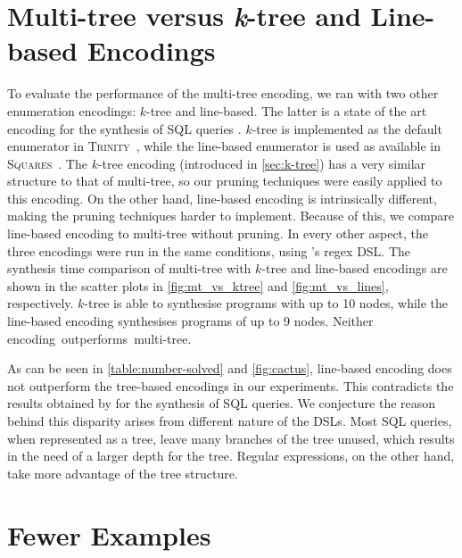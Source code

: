 \section{Multi-tree versus \texorpdfstring{\textit{k}-tree}{k-tree} and Line-based Encodings}\label{sec:multi-tree-vs-encodings}



To evaluate the performance of the multi-tree encoding, we ran \Forest{} with two other enumeration encodings: \(k\)-tree and line-based.
The latter is a state of the art encoding for the synthesis of SQL queries \cite{Orvalho19,DBLP:journals/pvldb/OrvalhoTVMM20}.
\(k\)-tree is implemented as the default enumerator in \textsc{Trinity}~\cite{trinity19}, while the line-based enumerator is used as available in \textsc{Squares}~\cite{squares-webpage}.
The \(k\)-tree encoding (introduced in \autoref{sec:k-tree}) has a very similar structure to that of multi-tree, so our pruning techniques were easily applied to this encoding.
%
On the other hand, line-based encoding is intrinsically different, making the pruning techniques harder to implement. Because of this, we compare line-based encoding to multi-tree without pruning.
%
In every other aspect, the three encodings were run in the same conditions, using \Forest{}'s regex \ac{DSL}.
The synthesis time comparison of multi-tree with \(k\)-tree and line-based encodings are shown in the scatter plots in \autoref{fig:mt_vs_ktree} and \autoref{fig:mt_vs_lines}, respectively.
\(k\)-tree is able to synthesise programs with up to 10 nodes, while the line-based encoding synthesises programs of up to 9 nodes. Neither encoding~outperforms~multi-tree.

As can be seen in \autoref{table:number-solved} and \autoref{fig:cactus}, line-based encoding does not outperform the tree-based encodings in our experiments. This contradicts the results obtained by \citet{Orvalho19} for the synthesis of SQL queries. We conjecture the reason behind this disparity arises from different nature of the DSLs. Most SQL queries, when represented as a tree, leave many branches of the tree unused, which results in the need of a larger depth for the tree. Regular expressions, on the other hand, take more advantage of the tree structure.

\FloatBarrier
\section{Fewer Examples} \label{sec:fewer-exs}

